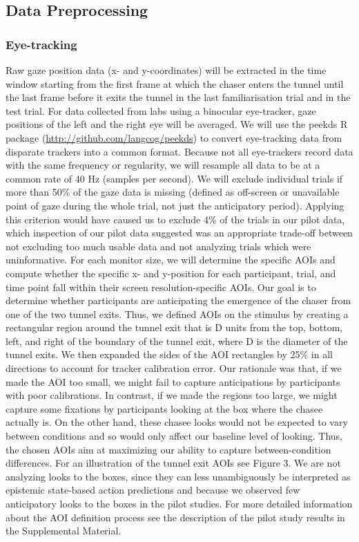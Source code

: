 \documentclass[
  man,floatsintext]{apa6}
\begin{document}
\subsection{Data Preprocessing}\label{data-preprocessing}

\subsubsection{Eye-tracking}\label{eye-tracking}

Raw gaze position data (x- and y-coordinates) will be extracted in the time window starting from the first frame at which the chaser enters the tunnel until the last frame before it exits the tunnel in the last familiarisation trial and in the test trial. For data collected from labs using a binocular eye-tracker, gaze positions of the left and the right eye will be averaged.
We will use the peekds R package (\url{http://github.com/langcog/peekds}) to convert eye-tracking data from disparate trackers into a common format. Because not all eye-trackers record data with the same frequency or regularity, we will resample all data to be at a common rate of 40 Hz (samples per second).
We will exclude individual trials if more than 50\% of the gaze data is missing (defined as off-screen or unavailable point of gaze during the whole trial, not just the anticipatory period). Applying this criterion would have caused us to exclude 4\% of the trials in our pilot data, which inspection of our pilot data suggested was an appropriate trade-off between not excluding too much usable data and not analyzing trials which were uninformative.
For each monitor size, we will determine the specific AOIs and compute whether the specific x- and y-position for each participant, trial, and time point fall within their screen resolution-specific AOIs. Our goal is to determine whether participants are anticipating the emergence of the chaser from one of the two tunnel exits. Thus, we defined AOIs on the stimulus by creating a rectangular region around the tunnel exit that is D units from the top, bottom, left, and right of the boundary of the tunnel exit, where D is the diameter of the tunnel exits. We then expanded the sides of the AOI rectangles by 25\% in all directions to account for tracker calibration error. Our rationale was that, if we made the AOI too small, we might fail to capture anticipations by participants with poor calibrations. In contrast, if we made the regions too large, we might capture some fixations by participants looking at the box where the chasee actually is. On the other hand, these chasee looks would not be expected to vary between conditions and so would only affect our baseline level of looking. Thus, the chosen AOIs aim at maximizing our ability to capture between-condition differences. For an illustration of the tunnel exit AOIs see Figure 3. We are not analyzing looks to the boxes, since they can less unambiguously be interpreted as epistemic state-based action predictions and because we observed few anticipatory looks to the boxes in the pilot studies. For more detailed information about the AOI definition process see the description of the pilot study results in the Supplemental Material.
\end{document}
